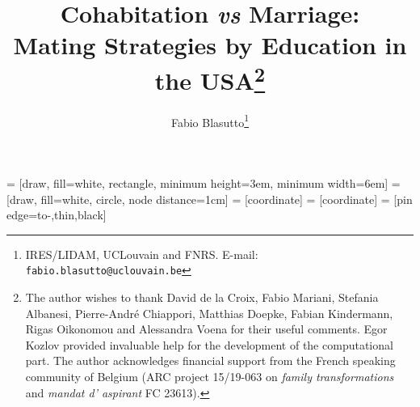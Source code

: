 \documentclass[12pt]{article}
\title{Cohabitation \textit{vs} Marriage:\\ Mating Strategies by Education in the USA\thanks{The author wishes to thank David de la Croix, Fabio Mariani, Stefania Albanesi, Pierre-André Chiappori, Matthias Doepke, Fabian Kindermann,  Rigas Oikonomou and Alessandra Voena for their useful comments. Egor Kozlov provided invaluable help for the development of the computational part. The author acknowledges financial support from the French speaking community of Belgium (ARC project 15/19-063 on \textit{family transformations} and \textit{mandat d' aspirant} FC 23613).}}
\author{Fabio Blasutto\thanks{IRES/LIDAM, UCLouvain and FNRS. E-mail: \tt{fabio.blasutto@uclouvain.be}}}
\begin{document}

 	 = [draw, fill=white, rectangle, 
 	minimum height=3em, minimum width=6em]
 	 = [draw, fill=white, circle, node distance=1cm]
 	 = [coordinate]
 	 = [coordinate]
 	 = [pin edge={to-,thin,black}]
 	
 	



	\maketitle
\end{document}
